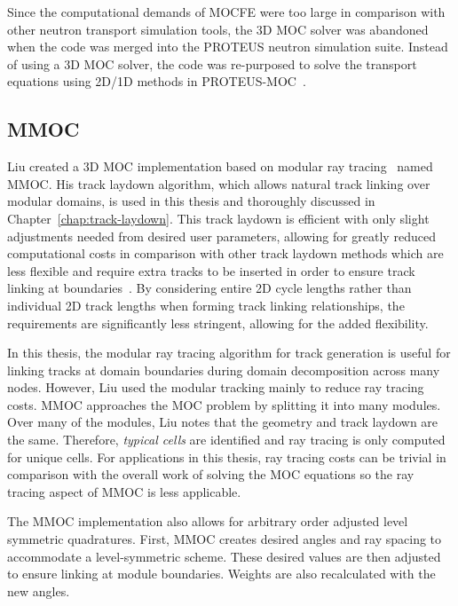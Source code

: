 Since the computational demands of MOCFE were too large in comparison with other neutron transport simulation tools, the 3D \ac{MOC} solver was abandoned when the code was merged into the PROTEUS neutron simulation suite. Instead of using a 3D \ac{MOC} solver, the code was re-purposed to solve the transport equations using 2D/1D methods in PROTEUS-MOC~\cite{proteus}.

\subsection{MMOC}
\label{sec:mmoc}

Liu created a 3D \ac{MOC} implementation based on modular ray tracing~\cite{liu_mrt} named MMOC. His track laydown algorithm, which allows natural track linking over modular domains, is used in this thesis and thoroughly discussed in Chapter~\ref{chap:track-laydown}. This track laydown is efficient with only slight adjustments needed from desired user parameters, allowing for greatly reduced computational costs in comparison with other track laydown methods which are less flexible and require extra tracks to be inserted in order to ensure track linking at boundaries~\cite{shaner-laydown}. By considering entire 2D cycle lengths rather than individual 2D track lengths when forming track linking relationships, the requirements are significantly less stringent, allowing for the added flexibility.

In this thesis, the modular ray tracing algorithm for track generation is useful for linking tracks at domain boundaries during domain decomposition across many nodes. However, Liu used the modular tracking mainly to reduce ray tracing costs. MMOC approaches the \ac{MOC} problem by splitting it into many modules. Over many of the modules, Liu notes that the geometry and track laydown are the same. Therefore, \textit{typical cells} are identified and ray tracing is only computed for unique cells. For applications in this thesis, ray tracing costs can be trivial in comparison with the overall work of solving the \ac{MOC} equations so the ray tracing aspect of MMOC is less applicable.

The MMOC implementation also allows for arbitrary order adjusted level symmetric quadratures. First, MMOC creates desired angles and ray spacing to accommodate a level-symmetric scheme. These desired values are then adjusted to ensure linking at module boundaries. Weights are also recalculated with the new angles.

